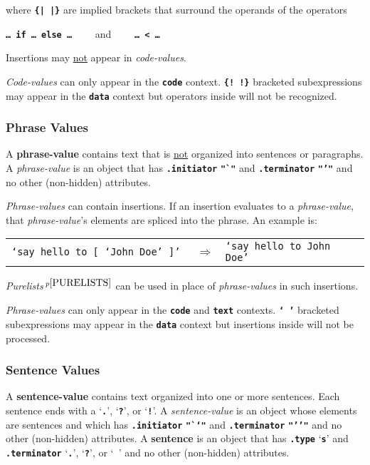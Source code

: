 \documentclass[12pt]{article}
\newcommand{\TT}[1]{{\tt \bfseries #1}}
\newcommand{\key}[1]{{\rm \bfseries #1}}
\newcommand{\pagnote}[1]{$\,^{p\pageref{#1}}$}
\newenvironment{indpar}[1][0.3in]%
	{\begin{list}{}%
		     {\setlength{\itemsep}{0in}%
		      \setlength{\topsep}{0in}%
		      \setlength{\parsep}{1ex}%
		      \setlength{\labelwidth}{#1}%
		      \setlength{\leftmargin}{#1}%
		      \addtolength{\leftmargin}{\labelsep}}%
	 \item}%
	{\end{list}}
\begin{document}
where \TT{\{|~|\}} are implied brackets that surround the
operands of the operators \\
\centerline{\TT{\ldots{}~if~\ldots{}~else~\ldots{}}
~~~~and~~~~ \TT{\ldots{}~<~\ldots{}}}

Insertions may \underline{not} appear in {\em code-values}.

{\em Code-values} can only appear in the \TT{code}
context.  \TT{\{!~!\}} bracketed subexpressions may appear in the
\TT{data} context but operators inside will not be recognized.

\subsubsection{Phrase Values}
\label{PHRASE-VALUES}

A \key{phrase-value} contains text that is \underline{not} organized into
sentences or paragraphs.
A {\em phrase-value} is an object
that has \TT{.initiator}
\TT{"`"} and \TT{.terminator}
\TT{"'"} and no other (non-hidden) attributes.

{\em Phrase-values} can contain insertions.
If an insertion evaluates to a {\em phrase-value}, that {\em phrase-value}'s
elements are spliced into the phrase.  An example is:
\begin{indpar}
\begin{tabular}{rcl}
\tt `say hello to \TT{[} `John Doe' \TT{]}' & $\Longrightarrow$
                                           & \tt `say hello to John Doe'
\end{tabular}
\end{indpar}
{\em Purelists}\pagnote{PURELISTS}
can be used in place of {\em phrase-values} in such insertions.

{\em Phrase-values} can only appear in the \TT{code} and \TT{text}
contexts.  \TT{`~'} bracketed subexpressions may appear in the
\TT{data} context but insertions inside will not be processed.

\subsubsection{Sentence Values}
\label{SENTENCE-VALUES}

A \key{sentence-value} contains text organized into one or more
sentences.  Each sentence ends with a `\TT{.}', `\TT{?}', or
`\TT{!}'.
A {\em sentence-value} is an object whose elements are sentences and which
has \TT{.initiator}
\TT{"`{}`"} and \TT{.terminator}
\TT{"'{}'"} and no other (non-hidden) attributes.
A \key{sentence} is an object that has \TT{.type} `\TT{s}'
and \TT{.terminator} `\TT{.}', `\TT{?}', or `\TT{~}' and
no other (non-hidden) attributes.
\end{document}
